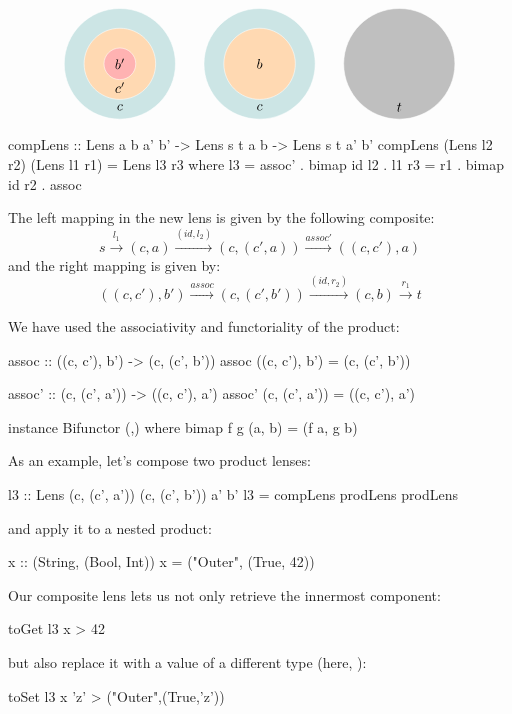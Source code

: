 \documentclass[DaoFP]{subfiles}
\begin{document}
\[
\begin{tikzpicture}
\filldraw[fill=blue!50!green!20, draw=white] (0, 0) circle (1.4);
\filldraw[fill=orange!30, draw=white] (0, 0) circle (0.9);
\filldraw[fill=red!30, draw=white] (0, 0) circle (0.4);
\node at (0, 0) {$b'$};
\node at (0, -0.6) {$c'$};
\node at (0, -1.1) {$c$};
\end{tikzpicture}
\hspace{20pt}
\begin{tikzpicture}
\filldraw[fill=blue!50!green!20, draw=white] (0, 0) circle (1.4);
\filldraw[fill=orange!30, draw=white] (0, 0) circle (0.9);
\node at (0, 0) {$b$};
\node at (0, -1.1) {$c$};
\end{tikzpicture}
\hspace{20pt}
\begin{tikzpicture}
\filldraw[fill=gray!50, draw=white] (0, 0) circle (1.4);
\node at (0, -1.1) {$t$};
\end{tikzpicture}
\]



\begin{haskell}
compLens :: Lens a b a' b' -> Lens s t a b -> Lens s t a' b'
compLens (Lens l2 r2) (Lens l1 r1) = Lens l3 r3
  where l3 = assoc' . bimap id l2  . l1
        r3 = r1 . bimap id r2 . assoc
\end{haskell}
The left mapping in the new lens is given by the following composite:
\[ s \xrightarrow{l_1} (c, a)   \xrightarrow{(id, l_2)} (c, (c', a))  \xrightarrow{assoc'} ((c, c'), a)\]
and the right mapping is given by:
\[ ((c, c'), b') \xrightarrow{assoc}  (c, (c', b')) \xrightarrow{(id, r_2)} (c, b) \xrightarrow{r_1} t \]

We have used the associativity and functoriality of the product:
\begin{haskell}
assoc :: ((c, c'), b') -> (c, (c', b'))
assoc ((c, c'), b') = (c, (c', b'))

assoc' :: (c, (c', a')) -> ((c, c'), a')
assoc' (c, (c', a')) = ((c, c'), a')

instance Bifunctor (,) where
  bimap f g (a, b) = (f a, g b)
\end{haskell}

As an example, let's compose two product lenses:
\begin{haskell}
l3 :: Lens (c, (c', a')) (c, (c', b')) a' b'
l3 = compLens prodLens prodLens
\end{haskell}
and apply it to a nested product:
\begin{haskell}
x :: (String, (Bool, Int))
x = ("Outer", (True, 42))
\end{haskell}
Our composite lens lets us not only retrieve the innermost component:
\begin{haskell}
toGet l3 x
> 42
\end{haskell}
but also replace it with a value of a different type (here, ):
\begin{haskell}
toSet l3 x 'z'
> ("Outer",(True,'z'))
\end{haskell}
\end{document}
